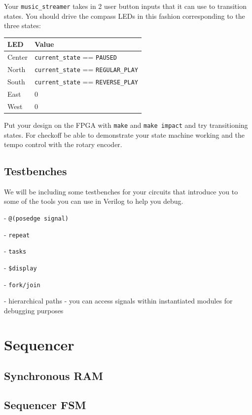 \documentclass[11pt]{article}
\begin{document}
Your \verb|music_streamer| takes in 2 user button inputs that it can use to transition states. You should drive the compass LEDs in this fashion corresponding to the three states:

\renewcommand{\arraystretch}{1.5}
\begin{center}
\begin{tabular}{| l | l |}
	\hline
	\textbf{LED} & \textbf{Value} \\ \hline
	Center & \verb|current_state| == \verb|PAUSED| \\ \hline
	North & \verb|current_state| == \verb|REGULAR_PLAY| \\ \hline
	South & \verb|current_state| == \verb|REVERSE_PLAY| \\ \hline
	East & 0 \\ \hline
	West & 0 \\ \hline
\end{tabular}
\end{center}

Put your design on the FPGA with \verb|make| and \verb|make impact| and try transitioning states. For checkoff be able to demonstrate your state machine working and the tempo control with the rotary encoder.

\subsection{Testbenches}

We will be including some testbenches for your circuits that introduce you to some of the tools you can use in Verilog to help you debug.

- \verb|@(posedge signal)|

- \verb|repeat|

- \verb|tasks|

- \verb|$display|

- \verb|fork/join|

- hierarchical paths - you can access signals within instantiated modules for debugging purposes

\section{Sequencer}

\subsection{Synchronous RAM}

\subsection{Sequencer FSM}
\end{document}
